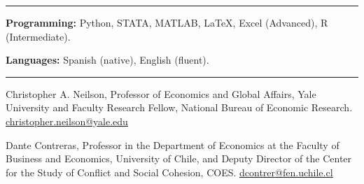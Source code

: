 \documentclass[11pt]{article}
\newcommand{\link}[2]{\href{#1}{\textcolor{linkblue}{\underline{#2}}}}
\newcommand{\cvsection}[1]{\vspace{9pt}{\bfseries #1}\par\vspace{2pt}\hrule\vspace{6pt}}
\newcommand{\gap}{\vspace{7pt}}
\begin{document}
\cvsection{SKILLS}

\textbf{Programming:} Python, STATA, MATLAB, LaTeX, Excel (Advanced), R (Intermediate).
\gap

\textbf{Languages:} Spanish (native), English (fluent).

\cvsection{REFERENCES}

Christopher A. Neilson, Professor of Economics and Global Affairs, Yale University and Faculty Research Fellow, National Bureau of Economic Research. \link{mailto:christopher.neilson@yale.edu}{christopher.neilson@yale.edu}
\gap

Dante Contreras, Professor in the Department of Economics at the Faculty of Business and Economics, University of Chile, and Deputy Director of the Center for the Study of Conflict and Social Cohesion, COES. \link{mailto:dcontrer@fen.uchile.cl}{dcontrer@fen.uchile.cl}
\end{document}
